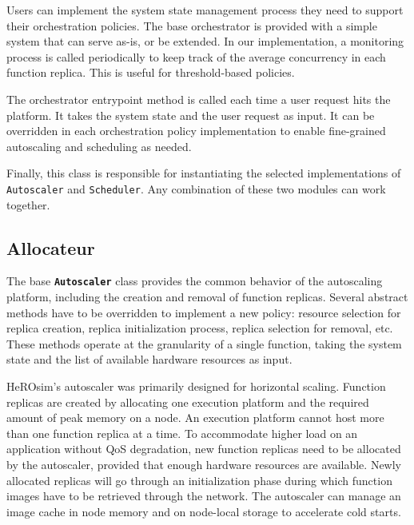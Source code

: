 Users can implement the system state management process they need to support their orchestration policies. The base orchestrator is provided with a simple system that can serve as-is, or be extended. %
In our implementation, a monitoring process is called periodically to keep track of the average concurrency in each function replica. This is useful for threshold-based policies.

The orchestrator entrypoint method is called each time a user request hits the platform. It takes the system state and the user request as input. It can be overridden in each orchestration policy implementation to enable fine-grained autoscaling and scheduling as needed.

Finally, this class is responsible for instantiating the selected implementations of \texttt{Autoscaler} and \texttt{Scheduler}. Any combination of these two modules can work together.

\subsection{Allocateur}

The base \textbf{\texttt{Autoscaler}} class provides the common behavior of the autoscaling platform, including the creation and removal of function replicas. Several abstract methods have to be overridden to implement a new policy: resource selection for replica creation, replica initialization process, replica selection for removal, etc. These methods operate at the granularity of a single function, taking the system state and the list of available hardware resources as input. %

HeROsim's autoscaler was primarily designed for horizontal scaling. Function replicas are created by allocating one execution platform and the required amount of peak memory on a node. An execution platform cannot host more than one function replica at a time. To accommodate higher load on an application without QoS degradation, new function replicas need to be allocated by the autoscaler, provided that enough hardware resources are available. Newly allocated replicas will go through an initialization phase during which function images have to be retrieved through the network. The autoscaler can manage an image cache in node memory and on node-local storage to accelerate cold starts.

